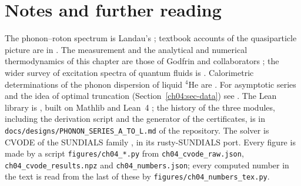\section*{Notes and further reading}

The phonon--roton spectrum is Landau's \cite{Landau1941}; textbook accounts of the quasiparticle picture are in \cite{PitaevskiiStringari2016,Donnelly1991}.
The measurement and the analytical and numerical thermodynamics of this chapter are those of Godfrin and collaborators \cite{Godfrin2021}; the wider survey of excitation spectra of quantum fluids is \cite{GodfrinKrotscheck2022}.
Calorimetric determinations of the phonon dispersion of liquid $^4$He are \cite{Phillips1970,Greywall1978}.
For asymptotic series and the idea of optimal truncation (Section~\ref{ch04:sec-data}) see \cite{BenderOrszag1999}.
The Lean library is \cite{Callens2026lib}, built on Mathlib \cite{Mathlib2020} and Lean~4 \cite{deMoura2021}; the history of the three modules, including the derivation script and the generator of the certificates, is in \texttt{docs/designs/PHONON\_SERIES\_A\_TO\_L.md} of the repository.
The solver is CVODE of the SUNDIALS family \cite{Hindmarsh2005}, in its rusty-SUNDIALS port.
Every figure is made by a script \texttt{figures/ch04\_*.py} from \texttt{ch04\_cvode\_raw.json}, \texttt{ch04\_cvode\_results.npz} and \texttt{ch04\_numbers.json}; every computed number in the text is read from the last of these by \texttt{figures/ch04\_numbers\_tex.py}.
